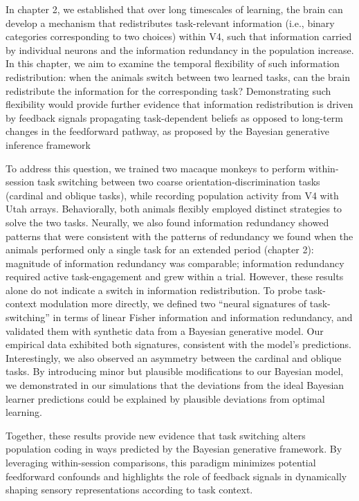 \documentclass[lineno,pdflatex,sn-basic]{sn-jnl}%
\theoremstyle{thmstyleone}%
\theoremstyle{thmstyletwo}%
\theoremstyle{thmstylethree}%
\begin{document}
In chapter 2, we established that over long timescales of learning, the brain can develop a mechanism that redistributes task-relevant information (i.e., binary categories corresponding to two choices) within V4, such that information carried by individual neurons and the information redundancy in the population increase. In this chapter, we aim to examine the temporal flexibility of such information redistribution: when the animals switch between two learned tasks, can the brain redistribute the information for the corresponding task? Demonstrating such flexibility would provide further evidence that information redistribution is driven by feedback signals propagating task-dependent beliefs as opposed to long-term changes in the feedforward pathway, as proposed by the Bayesian generative inference framework

To address this question, we trained two macaque monkeys to perform within-session task switching between two coarse orientation-discrimination tasks (cardinal and oblique tasks), while recording population activity from V4 with Utah arrays. Behaviorally, both animals flexibly employed distinct strategies to solve the two tasks. 
Neurally, we also found information redundancy showed patterns that were consistent with the patterns of redundancy we found when the animals performed only a single task for an extended period (chapter 2): magnitude of information redundancy was comparable; information redundancy required active task-engagement and grew within a trial. However, these results alone do not indicate a switch in information redistribution. To probe task-context modulation more directly, we defined two ``neural signatures of task-switching'' in terms of linear Fisher information and information redundancy, and validated them with synthetic data from a Bayesian generative model. Our empirical data exhibited both signatures, consistent with the model’s predictions. Interestingly, we also observed an asymmetry between the cardinal and oblique tasks. By introducing minor but plausible modifications to our Bayesian model, we demonstrated in our simulations that the deviations from the ideal Bayesian learner predictions could be explained by plausible deviations from optimal learning.


Together, these results provide new evidence that task switching alters population coding in ways predicted by the Bayesian generative framework. By leveraging within-session comparisons, this paradigm minimizes potential feedforward confounds and highlights the role of feedback signals in dynamically shaping sensory representations according to task context.
\end{document}
